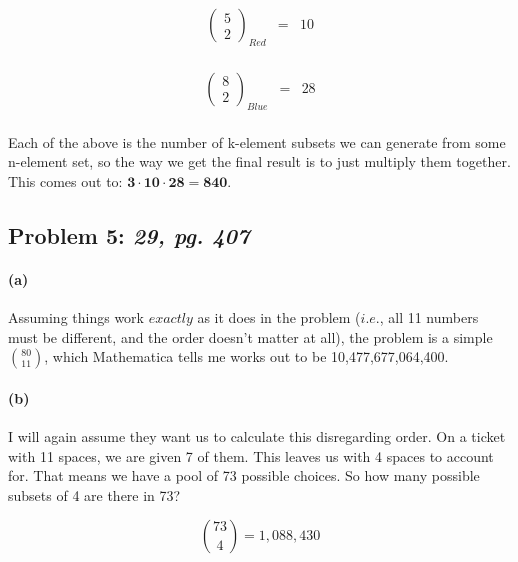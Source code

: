 \documentclass[a4paper]{article}
\begin{document}
\begin{equation}
\begin{array}{rll}
\left ( \begin{array}{c} 5 \\ 2 \end{array} \right )_{Red} & = & 10 \\[.15in]
\end{array}
\end{equation}

\begin{equation}
\begin{array}{rll}
\left ( \begin{array}{c} 8 \\ 2 \end{array} \right )_{Blue} & = & 28 \\[.15in]
\end{array}
\end{equation}

Each of the above is the number of k-element subsets we can generate from some n-element set, so the way we get the final result is to just multiply them together. This comes out to: $\mathbf{3 \cdot 10 \cdot 28 = 840}$.

\subsection*{Problem 5: \textit{29, pg. 407}}

\paragraph{(a)} Assuming things work $\textit{exactly}$ as it does in the problem ($\textit{i.e.}$, all 11 numbers must be different, and the order doesn't matter at all), the problem is a simple $80 \choose 11$, which Mathematica tells me works out to be 10,477,677,064,400.

\paragraph{(b)} I will again assume they want us to calculate this disregarding order. On a ticket with 11 spaces, we are given 7 of them. This leaves us with 4 spaces to account for. That means we have a pool of 73 possible choices. So how many possible subsets of 4 are there in 73?

\begin{equation}
{73 \choose 4} = 1,088,430
\end{equation}
\end{document}
